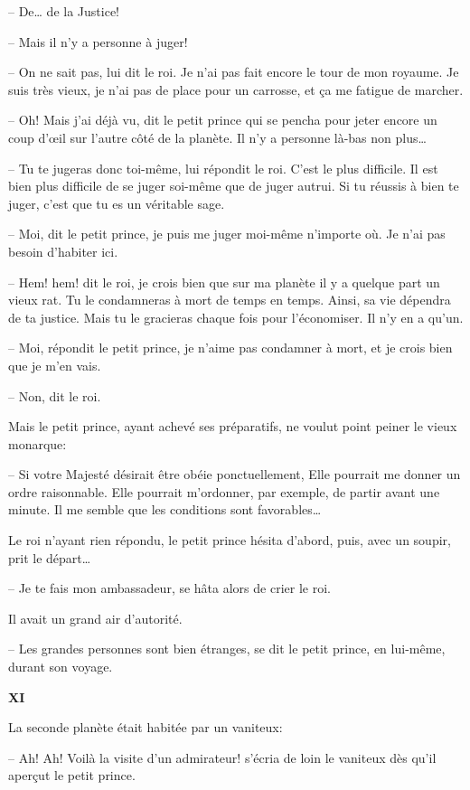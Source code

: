 \begin{Parallel}[p]{}{}
{-- De\ldots{} de la Justice!

-- Mais il n'y a personne à juger!

-- On ne sait pas, lui dit le roi. Je n'ai pas fait
encore le tour de mon royaume. Je suis très vieux, je
n'ai pas de place pour un carrosse, et ça me fatigue
de marcher.

-- Oh! Mais j'ai déjà vu, dit le petit prince qui se
pencha pour jeter encore un coup d'œil sur l'autre
côté de la planète. Il n'y a personne là-bas non
plus\ldots{}

-- Tu te jugeras donc toi-même, lui répondit le
roi. C'est le plus difficile. Il est bien plus difficile de
se juger soi-même que de juger autrui. Si tu réussis à
bien te juger, c'est que tu es un véritable sage.

-- Moi, dit le petit prince, je puis me juger moi-même n'importe où. Je n'ai pas besoin d'habiter ici.

-- Hem! hem! dit le roi, je crois bien que sur ma
planète il y a quelque part un vieux rat. Tu le condamneras à mort de temps en temps. Ainsi, sa vie dépendra de ta justice. Mais tu le gracieras chaque fois
pour l'économiser. Il n'y en a qu'un.

-- Moi, répondit le petit prince, je n'aime pas
condamner à mort, et je crois bien que je m'en vais.

-- Non, dit le roi.

Mais le petit prince, ayant achevé ses préparatifs,
ne voulut point peiner le vieux monarque:

-- Si votre Majesté désirait être obéie ponctuellement, Elle pourrait me donner un ordre raisonnable. Elle pourrait m'ordonner, par exemple, de partir avant une minute. Il me semble que les conditions sont favorables\ldots{}

Le roi n'ayant rien répondu, le petit prince hésita
d'abord, puis, avec un soupir, prit le départ\ldots{}

-- Je te fais mon ambassadeur, se hâta alors de
crier le roi.

Il avait un grand air d'autorité.

-- Les grandes personnes sont bien étranges, se
dit le petit prince, en lui-même, durant son voyage.

\textbf{XI}

La seconde planète était habitée par un vaniteux:

-- Ah! Ah! Voilà la visite d'un admirateur! s'écria de loin le vaniteux dès qu'il aperçut le petit prince.

}
\end{Parallel}
